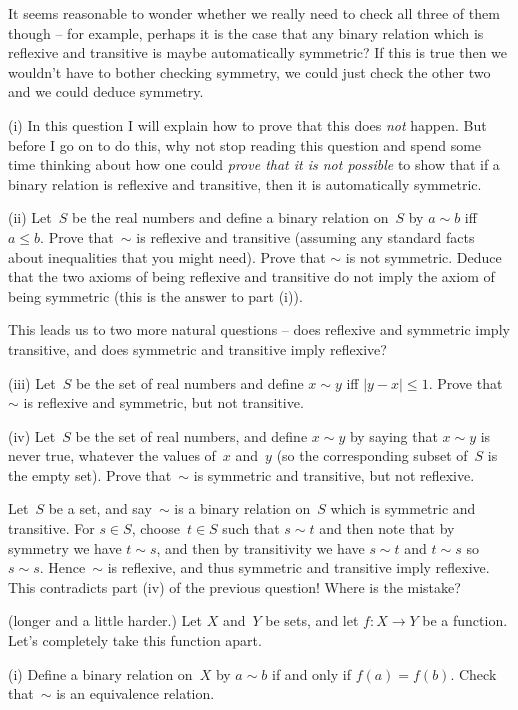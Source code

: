 \documentclass[10pt]{article}
\begin{document}
It seems reasonable to wonder whether we really need to check all three of them though -- for example, perhaps it is the case that any binary relation which is reflexive and transitive is maybe automatically symmetric? If this is true then we wouldn't have to bother checking symmetry, we could just check the other two and we could deduce symmetry. 

(i) In this question I will explain how to prove that this does \emph{not} happen. But before I go on to do this, why not stop reading this question and spend some time thinking about how one could \emph{prove that it is not possible} to show that if a binary relation is reflexive and transitive, then it is automatically symmetric. 

(ii) Let~$S$ be the real numbers and define a binary relation on~$S$ by $a\sim b$ iff $a\leq b$. Prove that~$\sim$ is reflexive and transitive (assuming any standard facts about inequalities that you might need). Prove that $\sim$ is not symmetric. Deduce that the two axioms of being reflexive and transitive do not imply the axiom of being symmetric (this is the answer to part (i)).

This leads us to two more natural questions -- does reflexive and symmetric imply transitive, and does symmetric and transitive imply reflexive? 

(iii) Let~$S$ be the set of real numbers and define $x\sim y$ iff $|y-x|\leq 1$. Prove that~$\sim$ is reflexive and symmetric, but not transitive.

(iv) Let~$S$ be the set of real numbers, and define $x\sim y$ by saying that $x\sim y$ is never true, whatever the values of~$x$ and~$y$ (so the corresponding subset of~$S$ is the empty set). Prove that~$\sim$ is symmetric and transitive, but not reflexive.

\medskip{} Let~$S$ be a set, and say~$\sim$ is a binary relation on~$S$ which is symmetric and transitive. For $s\in S$, choose~$t\in S$ such that $s\sim t$ and then note that by symmetry we have $t\sim s$, and then by transitivity we have $s\sim t$ and $t\sim s$ so $s\sim s$. Hence~$\sim$ is reflexive, and thus symmetric and transitive imply reflexive. This contradicts part (iv) of the previous question! Where is the mistake?

\medskip{} (longer and a little harder.) Let $X$ and~$Y$ be sets, and let $f:X\to Y$ be a function. Let's completely take this function apart.

(i) Define a binary relation on~$X$ by $a\sim b$ if and only if $f(a)=f(b)$. Check that~$\sim$ is an equivalence relation.
\end{document}
